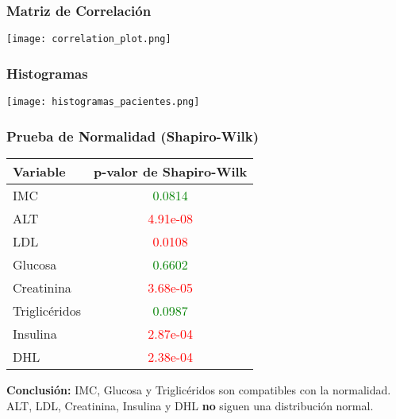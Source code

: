 
\begin{frame}
    \frametitle{Matriz de Correlación} %
    \begin{center}
        \texttt{[image: correlation\_plot.png]} %
    \end{center}
\end{frame}


\begin{frame}
    \frametitle{Histogramas} %
    \begin{center}
        \texttt{[image: histogramas\_pacientes.png]} %
    \end{center}
\end{frame}



\begin{frame}
    \frametitle{Prueba de Normalidad (Shapiro-Wilk)}
    
    \scriptsize
    \begin{table}[]
        \centering
        \begin{tabular}{l c}
            \hline
            \textbf{Variable} & \textbf{p-valor de Shapiro-Wilk} \\
            \hline
            IMC & \textcolor{green}{0.0814} \\
            ALT & \textcolor{red}{4.91e-08} \\
            LDL & \textcolor{red}{0.0108} \\
            Glucosa & \textcolor{green}{0.6602} \\
            Creatinina & \textcolor{red}{3.68e-05} \\
            Triglicéridos & \textcolor{green}{0.0987} \\
            Insulina & \textcolor{red}{2.87e-04} \\
            DHL & \textcolor{red}{2.38e-04} \\
            \hline
        \end{tabular}
    \end{table}
    
    \vspace{0.4cm}
    \textbf{Conclusión:} IMC, Glucosa y Triglicéridos son compatibles con la normalidad.  
    ALT, LDL, Creatinina, Insulina y DHL \textbf{no} siguen una distribución normal.
\end{frame}


